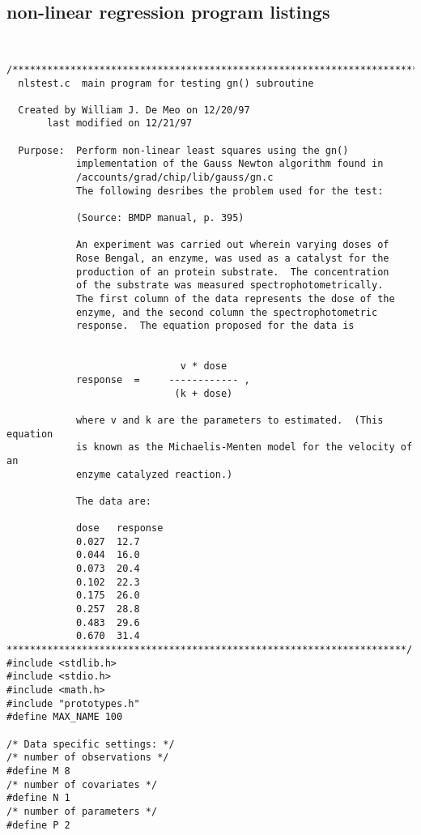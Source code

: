 \documentclass{article}
\begin{document}
\subsection{non-linear regression program listings}
{\tt
\begin{verbatim}
/***********************************************************************
  nlstest.c  main program for testing gn() subroutine     
                                                          
  Created by William J. De Meo on 12/20/97 
       last modified on 12/21/97
            
  Purpose:  Perform non-linear least squares using the gn() 
            implementation of the Gauss Newton algorithm found in 
            /accounts/grad/chip/lib/gauss/gn.c
            The following desribes the problem used for the test:

            (Source: BMDP manual, p. 395)

            An experiment was carried out wherein varying doses of 
            Rose Bengal, an enzyme, was used as a catalyst for the 
            production of an protein substrate.  The concentration
            of the substrate was measured spectrophotometrically.
            The first column of the data represents the dose of the 
            enzyme, and the second column the spectrophotometric 
            response.  The equation proposed for the data is
            
            
                              v * dose
            response  =     ------------ , 
                             (k + dose)
           
            where v and k are the parameters to estimated.  (This equation
            is known as the Michaelis-Menten model for the velocity of an
            enzyme catalyzed reaction.)

            The data are:

            dose   response
            0.027  12.7
            0.044  16.0
            0.073  20.4
            0.102  22.3
            0.175  26.0
            0.257  28.8
            0.483  29.6
            0.670  31.4
*********************************************************************/
#include <stdlib.h>
#include <stdio.h>
#include <math.h>
#include "prototypes.h"
#define MAX_NAME 100

/* Data specific settings: */
/* number of observations */
#define M 8
/* number of covariates */
#define N 1
/* number of parameters */
#define P 2


\end{verbatim}}
\end{document}
